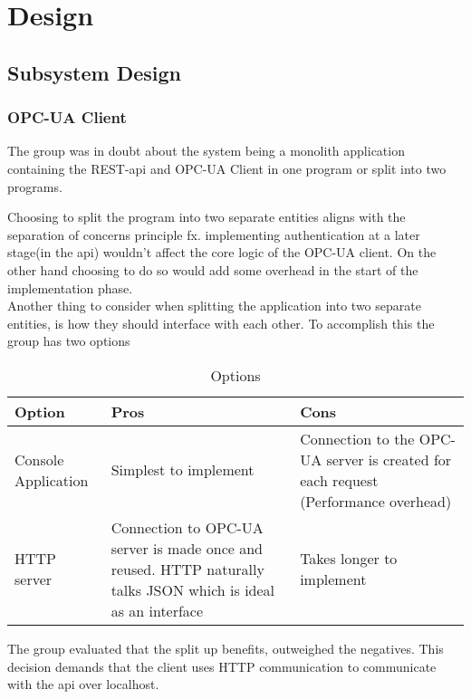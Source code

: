\section{Design}
\subsection{Subsystem Design}
\subsubsection{OPC-UA Client}
The group was in doubt about the system being a monolith application containing 
the REST-api and OPC-UA Client in one program or split into two programs.

Choosing to split the program into two separate entities aligns with the 
separation of concerns principle fx. implementing authentication at a later 
stage(in the api) wouldn't affect the core logic of the OPC-UA client. On the 
other hand choosing to do so would add some overhead in the start of the 
implementation phase. \\

Another thing to consider when splitting the application into two separate 
entities, is how they should interface with each other. To accomplish this the 
group has two options 

\begin{table}[ht]
    \begin{tabularx}{\textwidth}{|>{\RaggedRight}X|>{\RaggedRight}X|>{\RaggedRight}X|}
        \hline
        \textbf{Option} & \textbf{Pros} & \textbf{Cons} \\
        \hline
        Console Application & Simplest to implement & Connection to the OPC-UA 
        server is created for each request (Performance overhead)\\
        \hline
        HTTP server & Connection to OPC-UA server is made once and reused. HTTP
        naturally talks JSON which is ideal as an interface & Takes longer to 
        implement \\
        \hline
    \end{tabularx}
    \caption{Options}
    \label{someLabel}
\end{table}

The group evaluated that the split up benefits, outweighed the negatives. This 
decision demands that the client uses HTTP communication to communicate with the
api over localhost. 

